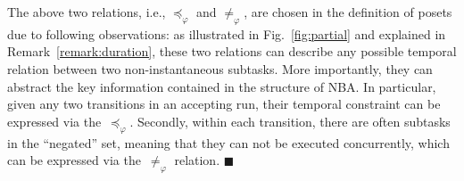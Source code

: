 \begin{remark}\label{remark:partial-order-motivation}
The above two relations, i.e., $\preceq_\varphi$ and $\neq_\varphi$,
are chosen in the definition of posets due to following observations:
as illustrated in Fig.~\ref{fig:partial} and explained in Remark~\ref{remark:duration},
these two relations can describe any possible temporal relation
between two non-instantaneous subtasks.
More importantly,
they can abstract the key information contained in the structure of NBA.
In particular, given any two transitions in an accepting run,
their temporal constraint can be expressed via the~$\preceq_\varphi$.
Secondly, within each transition, there are often subtasks in the ``negated'' set,
meaning that they can not be executed concurrently,
which can be expressed via the~$\neq_\varphi$ relation.
\hfill $\blacksquare$
\end{remark}

